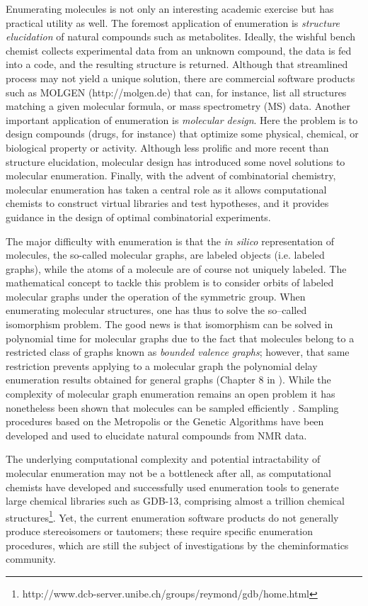 \documentclass{sig-alternate}
\begin{document}
Enumerating molecules is not only an interesting academic exercise but has
practical utility as well. The foremost application of enumeration is \emph{structure
elucidation} of natural compounds such as metabolites. 
Ideally, the wishful bench chemist collects experimental data
from an unknown compound, the data is fed into a code, and the resulting
structure is returned. Although that streamlined process may not yield a unique
solution, there are commercial software products such as MOLGEN
(http://molgen.de) that can, for instance, list all structures matching a given
molecular formula, or mass spectrometry (MS) data. Another important application
of enumeration is \emph{molecular design}. Here the problem is to design compounds
(drugs, for instance) that optimize some physical, chemical, or biological
property or activity. Although less prolific and more recent than structure
elucidation, molecular design has introduced some novel solutions to molecular
enumeration. Finally, with the advent of combinatorial chemistry, molecular
enumeration has taken a central role as it allows computational chemists to
construct virtual libraries and test hypotheses, and it provides guidance in the
design of optimal combinatorial experiments.

The major difficulty with enumeration is that the \emph{in silico}
representation of molecules, the so-called molecular graphs, are
labeled objects (i.e. labeled graphs), while the atoms of a molecule
are of course not uniquely labeled. The mathematical concept to tackle
this problem is to consider orbits of labeled molecular graphs under
the operation of the symmetric group. When enumerating molecular
structures, one has thus to solve the so--called isomorphism problem.
The good news is that isomorphism can be solved in polynomial time for
molecular graphs due to the fact that molecules belong to a restricted
class of graphs known as \emph{bounded valence graphs}; however, that
same restriction prevents applying to a molecular graph the polynomial
delay enumeration results obtained for general graphs (Chapter 8 in
\cite{faulon2010}). While the complexity of molecular graph
enumeration remains an open problem it has nonetheless been shown that
molecules can be sampled efficiently \cite{goldberg1999}. Sampling
procedures based on the Metropolis or the Genetic Algorithms have been
developed and used to elucidate natural compounds from NMR data.

The underlying computational complexity and potential intractability
of molecular enumeration may not be a bottleneck after all, as
computational chemists have developed and successfully used
enumeration tools to generate large chemical libraries such as GDB-13,
comprising almost a trillion chemical
structures\footnote{http://www.dcb-server.unibe.ch/groups/reymond/gdb/home.html}. Yet,
the current enumeration software products do not generally produce
stereoisomers or tautomers; these require specific enumeration
procedures, which are still the subject of investigations by the
cheminformatics community.
\end{document}
